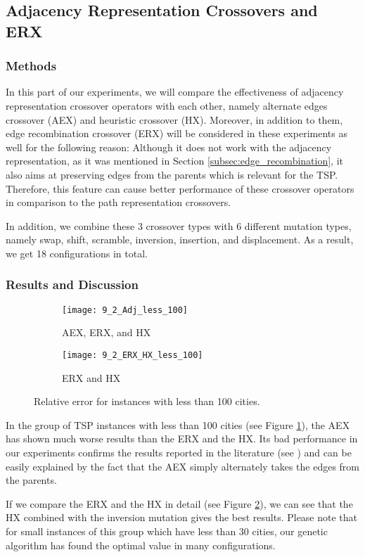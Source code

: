 \subsection{Adjacency Representation Crossovers and ERX}
\label{subsec:experiments_adj}

\subsubsection{Methods}

In this part of our experiments, we will compare the effectiveness of adjacency representation crossover operators with each other, namely  alternate edges crossover (AEX) and heuristic crossover (HX). Moreover, in addition to them, edge recombination crossover (ERX) will be considered in these experiments as well for the following reason: Although it does not work with the adjacency representation, as it was mentioned in Section \ref{subsec:edge_recombination}, it also aims at preserving edges from the parents which  is relevant for the TSP. Therefore, this feature can cause better performance of these crossover operators in comparison to the path representation crossovers. \par 

In addition, we combine these 3 crossover types with 6 different mutation types, namely swap, shift, scramble, inversion, insertion, and displacement.  As a result, we get 18 configurations in total.

\subsubsection{Results and Discussion}


\begin{figure}[htp] \centering
	\begin{subfigure}[t]{0.45\textwidth}
		\texttt{[image: 9\_2\_Adj\_less\_100]}
		\caption{AEX, ERX, and HX}
		\label{fig:9_2_Adj_less_100}
	\end{subfigure}
	\hfill
	\begin{subfigure}[t]{0.45\textwidth}
		\centering
		\texttt{[image: 9\_2\_ERX\_HX\_less\_100]}
		\caption{ERX and HX}
		\label{fig:9_2_ERX_HX_less_100}
	\end{subfigure}	
	\caption{Relative error for instances with less than 100 cities.}
	\label{fig:9_2_less_100}
\end{figure}

In the group of TSP instances with less than 100 cities (see Figure \ref{fig:9_2_Adj_less_100}), the AEX has shown much worse results than the ERX and the HX. Its bad performance in our experiments confirms the results reported in the literature (see \cite{grefenstette1985genetic}) and can be easily explained by the fact that the AEX simply alternately takes the edges from the parents.\par 
 If we compare the ERX and the HX in detail (see Figure \ref{fig:9_2_ERX_HX_less_100}), we can see that the HX combined with the inversion mutation gives the best results. Please note that for small instances of this group which have less than 30 cities, our genetic algorithm has found the optimal value in many configurations.\par 

